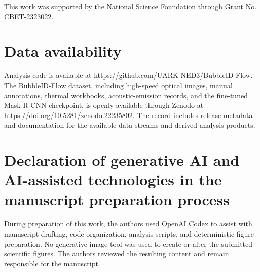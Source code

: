 \documentclass[preprint,12pt,sort&compress]{elsarticle}
\begin{document}
This work was supported by the National Science Foundation through Grant No. CBET-2323022.

\section*{Data availability}

\begin{sloppypar}
Analysis code is available at \url{https://github.com/UARK-NED3/BubbleID-Flow}. The BubbleID-Flow dataset, including high-speed optical images, manual annotations, thermal workbooks, acoustic-emission records, and the fine-tuned Mask R-CNN checkpoint, is openly available through Zenodo at \url{https://doi.org/10.5281/zenodo.22235802}. The record includes release metadata and documentation for the available data streams and derived analysis products.
\end{sloppypar}

\section*{Declaration of generative AI and AI-assisted technologies in the manuscript preparation process}

During preparation of this work, the authors used OpenAI Codex to assist with manuscript drafting, code organization, analysis scripts, and deterministic figure preparation. No generative image tool was used to create or alter the submitted scientific figures. The authors reviewed the resulting content and remain responsible for the manuscript.


{\small

}
\end{document}
